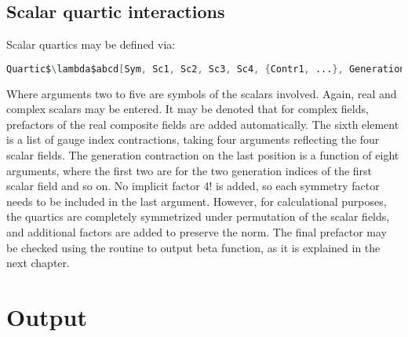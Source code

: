 \documentclass{scrartcl}
\begin{document}
\subsection{Scalar quartic interactions}
Scalar quartics may be defined via:
\begin{lstlisting}[language=mathematica,mathescape,columns=flexible,backgroundcolor=\color{light-gray}]
Quartic$\lambda$abcd[Sym, Sc1, Sc2, Sc3, Sc4, {Contr1, ...}, GenerationContr];
\end{lstlisting}
Where arguments two to five are symbols of the scalars involved. Again, real and complex scalars may be entered. It may be denoted that for complex fields, prefactors of the real composite fields are added automatically. The sixth element is a list of gauge index contractions, taking four arguments reflecting the four scalar fields. The generation contraction on the last position is a function of eight arguments, where the first two are for the two generation indices of the first scalar field and so on. \newline No implicit factor 4! is added, so each symmetry factor needs to be included in the last argument. However, for calculational purposes, the quartics are completely symmetrized under permutation of the scalar fields, and additional factors are added to preserve the norm. The final prefactor may be checked using the routine to output beta function, as it is explained in the next chapter.
\newpage
\section{Output}
\end{document}
